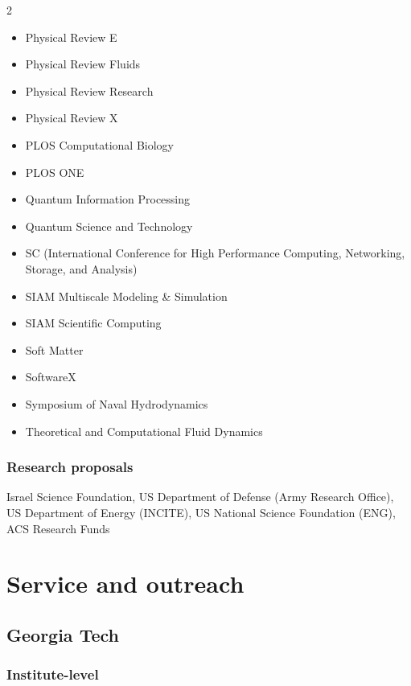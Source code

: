 \begin{multicols}{2}
\begin{itemize}
    \item Physical Review E
    \item Physical Review Fluids
    \item Physical Review Research
    \item Physical Review X
    \item PLOS Computational Biology
    \item PLOS ONE
    \item Quantum Information Processing
    \item Quantum Science and Technology
    \item SC (International Conference for High Performance Computing, Networking, Storage, and Analysis)
    \item SIAM Multiscale Modeling \& Simulation
    \item SIAM Scientific Computing
    \item Soft Matter
    \item SoftwareX
    \item Symposium of Naval Hydrodynamics
    \item Theoretical and Computational Fluid Dynamics
\end{itemize}
\end{multicols}

\subsubsection{Research proposals}

Israel Science Foundation, US Department of Defense (Army Research Office), US Department of Energy (INCITE), US National Science Foundation (ENG), ACS Research Funds

\section{Service and outreach}

\subsection{Georgia Tech}

\subsubsection{Institute-level}

